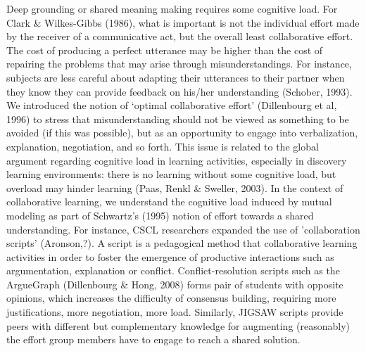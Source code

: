 \documentclass[twocolumn]{article}
\begin{document}
Deep grounding or shared meaning making requires some cognitive load. For Clark
\& Wilkes-Gibbs (1986), what is important is not the individual effort made by
the receiver of a communicative act, but the overall least collaborative effort.
The cost of producing a perfect utterance may be higher than the cost of
repairing the problems that may arise through misunderstandings. For instance,
subjects are less careful about adapting their utterances to their partner when
they know they can provide feedback on his/her understanding (Schober, 1993). We
introduced the notion of ‘optimal collaborative effort’ (Dillenbourg et al,
1996) to stress that misunderstanding should not be viewed as something to be
avoided (if this was possible), but as an opportunity to engage into
verbalization, explanation, negotiation, and so forth. This issue is related to
the global argument regarding cognitive load in learning activities, especially
in discovery learning environments: there is no learning without some cognitive
load, but overload may hinder learning (Paas, Renkl \& Sweller, 2003). In the
context of collaborative learning, we understand the cognitive load induced by
mutual modeling as part of Schwartz’s (1995) notion of effort towards a shared
understanding. For instance, CSCL researchers expanded the use of 'collaboration
scripts' (Aronson,?). A script is a pedagogical method that collaborative
learning activities in order to foster the emergence of productive interactions
such as argumentation, explanation or conflict. Conflict-resolution scripts such
as the ArgueGraph (Dillenbourg \& Hong, 2008) forms pair of students with
opposite opinions, which increases the difficulty of consensus building,
requiring more justifications, more negotiation, more load. Similarly, JIGSAW
scripts provide peers with different but complementary knowledge for augmenting
(reasonably) the effort group members have to engage to reach a shared solution. 
\end{document}
